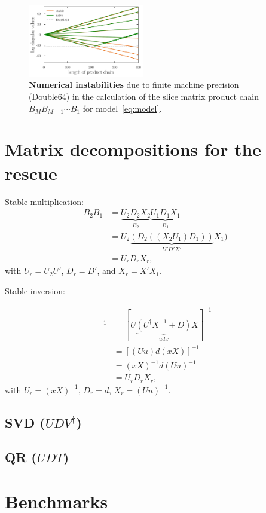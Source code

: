 \documentclass[%
 reprint,
superscriptaddress,
showpacs,
 amsmath,amssymb,
 aps,
 prb,
longbibliography,
]{revtex4-1}
\begin{document}
\begin{figure}[h]
	\includegraphics[width=0.45\textwidth]{../notebooks/naive_vs_stable_db64.pdf}
	\caption{\textbf{Numerical instabilities} due to finite machine precision (Double64) in the calculation of the slice matrix product chain $B_M B_{M-1} \cdots B_1$ for model~\eqref{eq:model}. \label{fig:naive_vs_stable_db64}}
\end{figure}

\section{\label{sec:decompositions}Matrix decompositions for the rescue}

Stable multiplication:
\begin{align}
B_2 B_1 &= \underbrace{U_2 D_2 X_2}_{B_2}\underbrace{U_1 D_1 X_1}_{B_1} \nonumber\\
&= U_2 \underbrace{(D_2 ((X_2 U_1) D_1))}_{U' D' X'} X_1)\\ &= U_r D_r X_r,
\end{align}
with $U_r = U_2 U'$, $D_r = D'$, and $X_r = X' X_1$.

Stable inversion:

\begin{align}
[1 + UDX]^{-1} &= [U\underbrace{(U^\dagger X^{-1} + D)}_{udx}X]^{-1} \\
&= [(Uu)d(xX)]^{-1} \nonumber\\
&= (xX)^{-1} d (Uu)^{-1}\nonumber\\
&= U_r D_r X_r,
\end{align}
with $U_r = (xX)^{-1}$, $D_r = d$, $X_r = (Uu)^{-1}$.

\subsection{SVD ($UDV^\dagger$)}

\subsection{QR ($UDT$)}


\section{Benchmarks}
\end{document}
